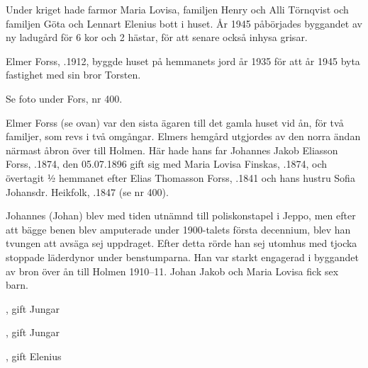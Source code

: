 Under kriget hade farmor Maria Lovisa, familjen Henry och Alli Törnqvist och familjen Göta och Lennart Elenius bott i huset. År 1945 påbörjades byggandet av ny ladugård för 6 kor och 2 hästar, för att senare också inhysa grisar.
\begin{jhchildren}
  \item {}
  \item {}
  \item {}
  \item {}
\end{jhchildren}


%
Elmer Forss, .1912, byggde huset på hemmanets jord år 1935 för att år 1945 byta fastighet med sin bror Torsten.


%

Se foto under Fors, nr 400.

%
Elmer Forss (se ovan) var den sista ägaren till det gamla huset vid ån, för två familjer, som revs i två omgångar. Elmers hemgård utgjordes av den norra ändan närmast åbron över till Holmen. Här hade hans far Johannes Jakob Eliasson Forss, .1874, den 05.07.1896 gift sig med Maria Lovisa Finskas, .1874, och övertagit ½ hemmanet efter Elias Thomasson Forss, .1841 och hans hustru Sofia Johansdr. Heikfolk, .1847 (se nr 400).

Johannes (Johan) blev med tiden utnämnd till poliskonstapel i Jeppo, men efter att bägge benen blev amputerade under 1900-talets första decennium, blev han tvungen att avsäga sej uppdraget. Efter detta rörde han sej utomhus med tjocka stoppade läderdynor under benstumparna. Han var starkt engagerad i byggandet av bron över ån till Holmen 1910--11.
Johan Jakob och Maria Lovisa fick sex barn.
\begin{jhchildren}
  \item {}, gift Jungar
  \item {}
  \item {}, gift Jungar
  \item {}
  \item {}
  \item {}, gift Elenius
\end{jhchildren}

